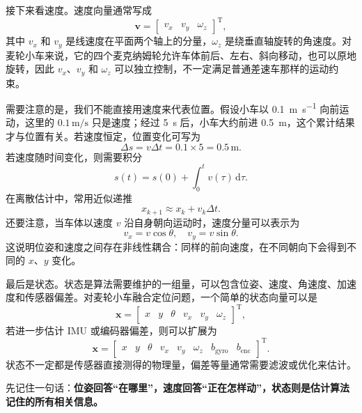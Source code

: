 \documentclass[UTF8,zihao=-4]{ctexart}
\begin{document}
接下来看速度。速度向量通常写成
\begin{equation}
\bm{v}=\begin{bmatrix}v_x&v_y&\omega_z\end{bmatrix}^{\mathrm T},
\end{equation}
其中 $v_x$ 和 $v_y$ 是线速度在平面两个轴上的分量，$\omega_z$ 是绕垂直轴旋转的角速度。对麦轮小车来说，它的四个麦克纳姆轮允许车体前后、左右、斜向移动，也可以原地旋转，因此 $v_x$、$v_y$ 和 $\omega_z$ 可以独立控制，不一定满足普通差速车那样的运动约束。

需要注意的是，我们不能直接用速度来代表位置。假设小车以 \SI{0.1}{\metre\per\second} 向前运动，这里的 $0.1\,\text{m/s}$ 只是速度；经过 \SI{5}{\second} 后，小车大约前进 \SI{0.5}{\metre}，这个累计结果才与位置有关。若速度恒定，位置变化可写为
\begin{equation}
\Delta s = v \Delta t = 0.1 \times 5 = 0.5\,\text{m}.
\end{equation}
若速度随时间变化，则需要积分
\begin{equation}
s(t)=s(0)+\int_0^t v(\tau)\,\mathrm{d}\tau.
\end{equation}
在离散估计中，常用近似递推
\begin{equation}
x_{k+1}\approx x_k+v_k\Delta t.
\end{equation}
还要注意，当车体以速度 $v$ 沿自身朝向运动时，速度分量可以表示为
\begin{equation}
v_x=v\cos\theta,\quad v_y=v\sin\theta.
\end{equation}
这说明位姿和速度之间存在非线性耦合：同样的前向速度，在不同朝向下会得到不同的 $x$、$y$ 变化。

最后是状态。状态是算法需要维护的一组量，可以包含位姿、速度、角速度、加速度和传感器偏差。对麦轮小车融合定位问题，一个简单的状态向量可以是
\begin{equation}
\bm{x}=\begin{bmatrix}x&y&\theta&v_x&v_y&\omega_z\end{bmatrix}^{\mathrm T},
\end{equation}
若进一步估计 IMU 或编码器偏差，则可以扩展为
\begin{equation}
\bm{x}=\begin{bmatrix}x&y&\theta&v_x&v_y&\omega_z&b_{\mathrm{gyro}}&b_{\mathrm{enc}}\end{bmatrix}^{\mathrm T}.
\end{equation}
状态不一定都是传感器直接测得的物理量，偏差等量通常需要滤波或优化来估计。

先记住一句话：\textbf{位姿回答“在哪里”，速度回答“正在怎样动”，状态则是估计算法记住的所有相关信息。}
\end{document}

